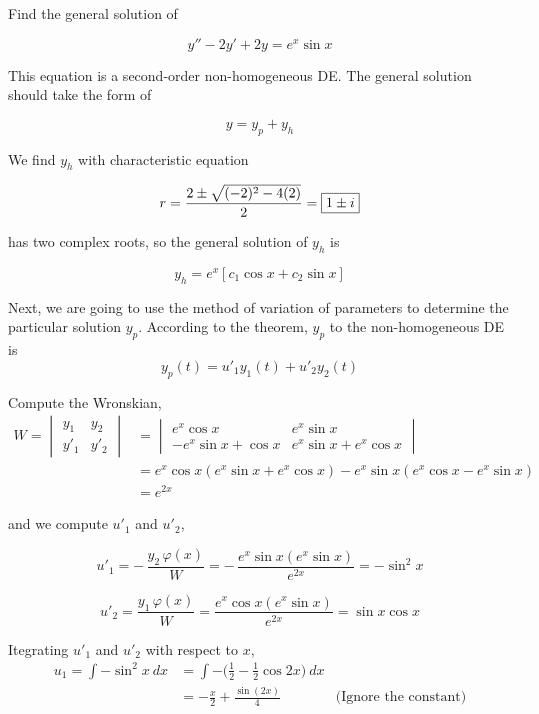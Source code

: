 \begin{example}
    Find the general solution of 

    \[
        y'' -2y' + 2y = e^x \sin x
    \]
\end{example}
\begin{solution}
    This equation is a second-order non-homogeneous DE. The general solution 
    should take the form of 
    
    \[
        y = y_p + y_h
    \]

    We find $y_h$ with characteristic equation 

    \[
        r = \frac{2 \pm \sqrt{(-2)^2 - 4(2)}}{2} = \fbox{$1 \pm i$}
    \]

    has two complex roots, so the general solution of $y_h$ is 

    \[
        y_h = e^{x}[c_1 \cos x + c_2 \sin x]
    \]
    
    Next, we are going to use the method of variation of parameters to determine the 
    particular solution $y_p$. According to the theorem, $y_p$ to the 
    non-homogeneous DE is 
    \[
        y_p(t) = u'_1 y_1(t) + u'_2 y_2(t)
    \]

    Compute the Wronskian,
    \begin{align*}
        W = \begin{vmatrix}
            y_1 & y_2 \\ y'_1 & y'_2
        \end{vmatrix}
        &= \begin{vmatrix}
            e^x \cos x & e^x \sin x \\ -e^x \sin x + \cos x & e^x \sin x + e^x \cos x
        \end{vmatrix}\\
        &= e^x \cos x (e^x \sin x + e^x \cos x) - e^x \sin x (e^x \cos x - e^x \sin x)\\
        &= e^{2x}
    \end{align*}

    and we compute $u'_1$ and $u'_2$,

    \[
        u'_1 = -\, \frac{y_2\, \varphi(x)}{W} = -\, \frac{e^x \sin x (e^x \sin x)}{e^{2x}} = - \sin^2 x
    \]

    \[
        u'_2 = \frac{y_1\, \varphi(x)}{W} = \frac{e^x \cos x (e^x \sin x)}{e^{2x}} = \sin x \cos x
    \]

    Itegrating $u'_1$ and $u'_2$ with respect to $x$,
    \begin{align*}
        u_1 = \int - \sin^2 x \> dx &= \int -\biggl( \frac{1}{2} - \frac{1}{2}\cos 2x \biggr) \> dx \\
        &= -\frac{x}{2} + \frac{\sin (2x)}{4} & \text{(Ignore the constant)}
    \end{align*}


\end{solution}
